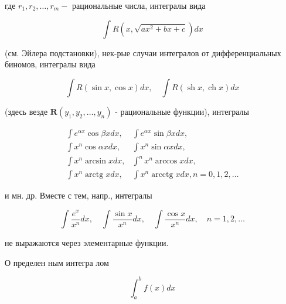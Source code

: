 \documentclass[10pt]{article}
\begin{document}
где $r_{1}, r_{2}, \ldots, r_{m}-$ рациональные числа, интегралы вида



\[

\int R\left(x, \sqrt{a x^{2}+b x+c}\right) d x

\]



(см. Эйлера подстановки), нек-рые случаи интегралов от дифференциальных биномов, интегралы вида



\[

\int R(\sin x, \cos x) d x, \quad \int R(\operatorname{sh} x, \operatorname{ch} x) d x

\]



(здесь везде $\boldsymbol{R}\left(y_{1}, y_{2}, \ldots, y_{n}\right)$ - рациональные функции), интегралы



\[

\begin{array}{ll}

\int e^{\alpha x} \cos \beta x d x, & \int e^{\alpha x} \sin \beta x d x, \\

\int x^{n} \cos \alpha x d x, & \int x^{n} \sin \alpha x d x, \\

\int x^{n} \arcsin x d x, & \int^{n} x^{n} \arccos x d x, \\

\int x^{n} \operatorname{arctg} x d x, & \int x^{n} \operatorname{arcctg} x d x, n=0,1,2, \ldots

\end{array}

\]



и мн. др. Вместе с тем, напр., интегралы



\[

\int \frac{e^{x}}{x^{n}} d x, \quad \int \frac{\sin x}{x^{n}} d x, \quad \int \frac{\cos x}{x^{n}} d x, \quad n=1,2, \ldots

\]



не выражаются через элементарные функции.



О пределен ным интегра лом



\[

\int_{a}^{b} f(x) d x

\]
\end{document}
